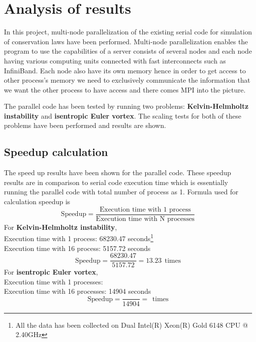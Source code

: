 \section{Analysis of results}
In this project, multi-node parallelization of the existing serial code for simulation of conservation laws have been performed. Multi-node parallelization enables the program to use the capabilities of a server consists of several nodes and each node having various computing units connected with fast interconnects such as {\ttfamily InfiniBand}. Each node also have its own memory hence in order to get access to other process's memory we need to exclusively communicate the information that we want the other process to have access and there comes {\ttfamily MPI} into the picture.

The parallel code has been tested by running two problems: \textbf{Kelvin-Helmholtz instability} and \textbf{isentropic Euler vortex}. The scaling tests for both of these problems have been performed and results are shown.
\subsection{Speedup calculation}
The speed up results have been shown for the parallel code. These speedup results are in comparison to serial code execution time which is essentially running the parallel code with total number of process as 1. Formula used for calculation speedup is
\begin{equation*}
    \text{Speedup} = \frac{\text{Execution time with 1 process}}{\text{Execution time with N processes}}
\end{equation*}
For \textbf{Kelvin-Helmholtz instability}, \\
Execution time with 1 process: 68230.47 seconds\footnote[3]{All the data has been collected on Dual Intel(R) Xeon(R) Gold 6148 CPU @ 2.40GHz}\\
Execution time with 16 process: 5157.72 seconds
\begin{equation*}
    \text{Speedup} = \frac{68230.47}{5157.72} = 13.23~~\text{times}
\end{equation*}
\linebreak
For \textbf{isentropic Euler vortex},\\
Execution time with 1 processes: \footnotemark[3] \\
Execution time with 16 processes: 14904 seconds
\begin{equation*}
    \text{Speedup} = \frac{}{14904} = ~~\text{times}
\end{equation*}
\vspace{10pt}
